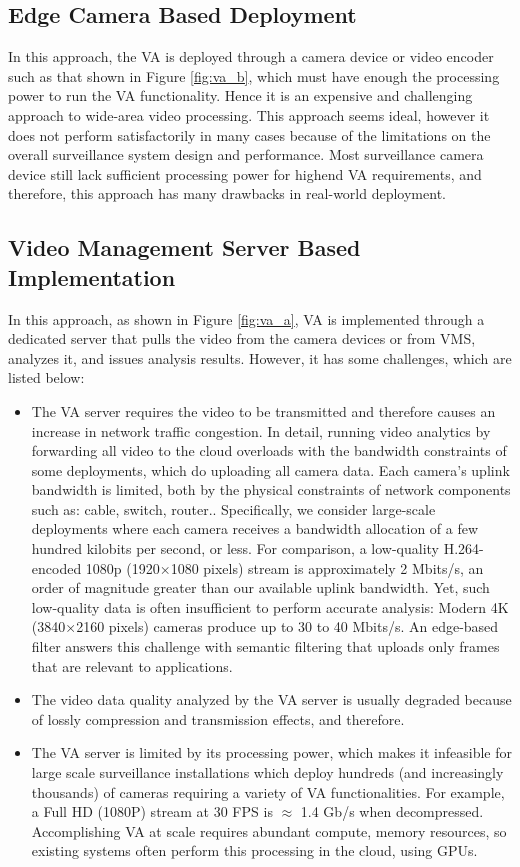 \subsection{Edge Camera Based Deployment}
In this approach, the VA is deployed through a  camera device or video encoder \cite{chen2017smart} such as that shown in Figure \ref{fig:va_b}, which must have enough the processing power to run the VA functionality. Hence it is an expensive and challenging approach to wide-area video processing. This approach seems ideal, however it does not perform satisfactorily in many cases because of the limitations on the overall surveillance system design and performance. Most surveillance camera device still lack sufficient processing power for highend VA requirements, and therefore, this approach has many drawbacks in real-world deployment. 
\subsection{Video Management Server Based Implementation}
In this approach, as shown in Figure \ref{fig:va_a}, VA is implemented through a dedicated server that pulls the video from the camera devices or from VMS, analyzes it, and issues analysis results. However, it has some challenges, which are listed below:
\begin{itemize}
\item The VA server requires the video to be transmitted and therefore causes an increase in network traffic congestion. In detail, running video analytics by forwarding all video to the cloud overloads with the bandwidth constraints of some deployments, which do uploading all camera data. Each camera’s uplink bandwidth is limited, both by the physical constraints of network components such as: cable, switch, router.. Specifically, we consider large-scale deployments where each camera receives a bandwidth allocation of a few hundred kilobits per second, or less. For comparison, a low-quality H.264-encoded 1080p (1920×1080 pixels) stream is approximately 2 Mbits/s, an order of magnitude greater than our available uplink bandwidth. Yet, such low-quality data is often insufficient to perform accurate analysis: Modern 4K (3840×2160 pixels) cameras produce up to 30 to 40 Mbits/s. An edge-based filter answers this challenge with semantic filtering that uploads only frames that are relevant to applications.
\item The video data quality analyzed by the VA server is usually degraded because of lossly compression and transmission effects, and therefore.
\item The VA server is limited by its processing power, which makes it infeasible for large scale surveillance installations which deploy hundreds (and increasingly thousands) of cameras requiring a variety of VA functionalities. For example, a Full HD (1080P) stream at 30 FPS is $\approx$ 1.4 Gb/s when decompressed. Accomplishing VA at scale requires abundant compute, memory resources, so existing systems often perform this processing in the cloud, using GPUs.
\end{itemize}
